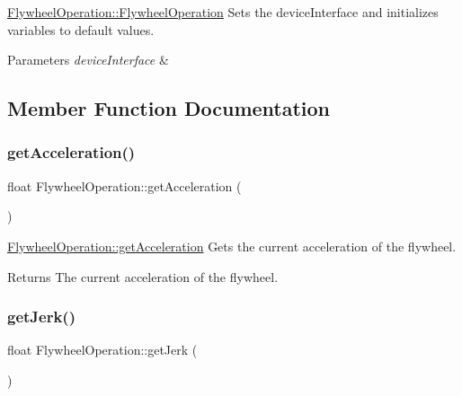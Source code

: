 \hyperlink{class_flywheel_operation_a4735eb5ddf58ba1d0bf93e37a2885c76}{Flywheel\+Operation\+::\+Flywheel\+Operation} Sets the device\+Interface and initializes variables to default values. 


\begin{DoxyParams}{Parameters}
{\em device\+Interface} & \\
\hline
\end{DoxyParams}


\subsection{Member Function Documentation}
\hypertarget{class_flywheel_operation_a23310ab41f29ee3d510c2d412fde801b}{}\label{class_flywheel_operation_a23310ab41f29ee3d510c2d412fde801b} 
\subsubsection{\texorpdfstring{get\+Acceleration()}{getAcceleration()}}
{\footnotesize\ttfamily float Flywheel\+Operation\+::get\+Acceleration (\begin{DoxyParamCaption}{ }\end{DoxyParamCaption})}



\hyperlink{class_flywheel_operation_a23310ab41f29ee3d510c2d412fde801b}{Flywheel\+Operation\+::get\+Acceleration} Gets the current acceleration of the flywheel. 

\begin{DoxyReturn}{Returns}
The current acceleration of the flywheel. 
\end{DoxyReturn}
\hypertarget{class_flywheel_operation_ad443ef22229c1584da213f50234720bf}{}\label{class_flywheel_operation_ad443ef22229c1584da213f50234720bf} 
\subsubsection{\texorpdfstring{get\+Jerk()}{getJerk()}}
{\footnotesize\ttfamily float Flywheel\+Operation\+::get\+Jerk (\begin{DoxyParamCaption}{ }\end{DoxyParamCaption})}



